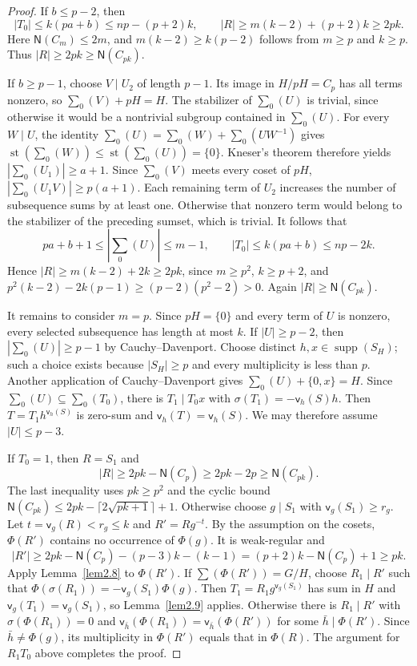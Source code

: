 \documentclass[10pt,reqno]{amsart}
\theoremstyle{definition}
\theoremstyle{remark}
\numberwithin{equation}{section}
\DeclareMathOperator{\supp}{supp}
\DeclareMathOperator{\st}{st}
\begin{document}
\begin{proof}
If $b\le p-2$, then
\[
 |T_0|\le k(pa+b)\le np-(p+2)k,
 \qquad |R|\ge m(k-2)+(p+2)k\ge2pk.
\]
Here $\mathsf N(C_m)\le2m$, and
$m(k-2)\ge k(p-2)$ follows from $m\ge p$ and $k\ge p$.
Thus $|R|\ge2pk\ge\mathsf N(C_{pk})$.

If $b\ge p-1$, choose $V\mid U_2$ of length $p-1$.
Its image in $H/pH=C_p$ has all terms nonzero, so
$\sum_0(V)+pH=H$.
The stabilizer of $\sum_0(U)$ is trivial, since otherwise it would be a
nontrivial subgroup contained in $\sum_0(U)$.
For every $W\mid U$, the identity
$\sum_0(U)=\sum_0(W)+\sum_0(UW^{-1})$ gives
$\st(\sum_0(W))\le\st(\sum_0(U))=\{0\}$.
Kneser's theorem therefore yields $|\sum_0(U_1)|\ge a+1$.
Since $\sum_0(V)$ meets every coset of $pH$,
$|\sum_0(U_1V)|\ge p(a+1)$.
Each remaining term of $U_2$ increases the number of subsequence sums
by at least one. Otherwise that nonzero term would belong to the
stabilizer of the preceding sumset, which is trivial.
It follows that
\[
 pa+b+1\le|\sum_0(U)|\le m-1,\qquad |T_0|\le k(pa+b)\le np-2k.
\]
Hence $|R|\ge m(k-2)+2k\ge2pk$, since $m\ge p^2$, $k\ge p+2$, and
$p^2(k-2)-2k(p-1)\ge(p-2)(p^2-2)>0$.
Again $|R|\ge\mathsf N(C_{pk})$.

It remains to consider $m=p$.
Since $pH=\{0\}$ and every term of $U$ is nonzero, every selected
subsequence has length at most $k$.
If $|U|\ge p-2$, then $|\sum_0(U)|\ge p-1$ by Cauchy--Davenport.
Choose distinct $h,x\in\supp(S_H)$; such a choice exists because
$|S_H|\ge p$ and every multiplicity is less than $p$.
Another application of Cauchy--Davenport gives
$\sum_0(U)+\{0,x\}=H$.
Since $\sum_0(U)\subseteq\sum_0(T_0)$, there is $T_1\mid T_0x$
with $\sigma(T_1)=-\mathsf v_h(S)h$.
Then $T=T_1h^{\mathsf v_h(S)}$ is zero-sum and
$\mathsf v_h(T)=\mathsf v_h(S)$.
We may therefore assume $|U|\le p-3$.

If $T_0=1$, then $R=S_1$ and
\[
 |R|\ge2pk-\mathsf N(C_p)\ge2pk-2p\ge\mathsf N(C_{pk}).
\]
The last inequality uses $pk\ge p^2$ and the cyclic bound
$\mathsf N(C_{pk})\le2pk-\lceil2\sqrt{pk+1}\rceil+1$.
Otherwise choose $g\mid S_1$ with $\mathsf v_g(S_1)\ge r_g$.
Let $t=\mathsf v_g(R)<r_g\le k$ and $R'=Rg^{-t}$.
By the assumption on the cosets, $\Phi(R')$ contains no occurrence of
$\Phi(g)$. It is weak-regular and
\[
 |R'|\ge2pk-\mathsf N(C_p)-(p-3)k-(k-1)
 =(p+2)k-\mathsf N(C_p)+1\ge pk.
\]
Apply Lemma~\ref{lem2.8} to $\Phi(R')$.
If $\sum(\Phi(R'))=G/H$, choose $R_1\mid R'$ such that
$\Phi(\sigma(R_1))=-\mathsf v_g(S_1)\Phi(g)$.
Then $T_1=R_1g^{\mathsf v_g(S_1)}$ has sum in $H$ and
$\mathsf v_g(T_1)=\mathsf v_g(S_1)$, so Lemma~\ref{lem2.9} applies.
Otherwise there is $R_1\mid R'$ with $\sigma(\Phi(R_1))=0$ and
$\mathsf v_{\bar h}(\Phi(R_1))=\mathsf v_{\bar h}(\Phi(R'))$
for some $\bar h\mid\Phi(R')$.
Since $\bar h\ne\Phi(g)$, its multiplicity in $\Phi(R')$ equals that
in $\Phi(R)$. The argument for $R_1T_0$ above completes the proof.
\end{proof}
\end{document}
